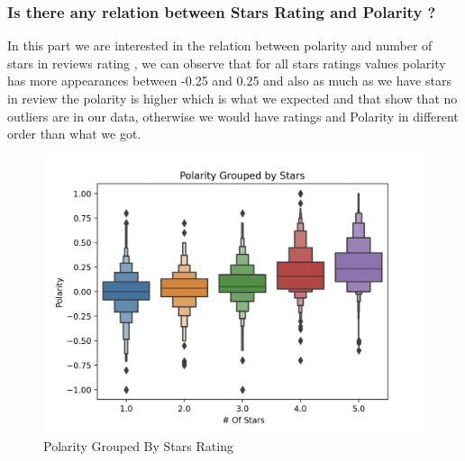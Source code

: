 \documentclass{article}
\begin{document}
\newpage
\subsubsection{ Is there any relation between Stars Rating and Polarity ? }
In this part we are interested in the relation between polarity and number of stars in reviews rating , we can observe that for all stars ratings values polarity has more appearances between -0.25 and 0.25 and also as much as we have stars in review the polarity is higher which is what we expected and that show that no outliers are in our data, otherwise we would have ratings and Polarity in different order than what we got.
\begin{figure}[H]
    \centering
    \includegraphics[scale=0.5]{src/img/Polarity_stars.png}
    \caption{Polarity Grouped By Stars Rating}
    \label{fig:my_label}
\end{figure}
\end{document}
